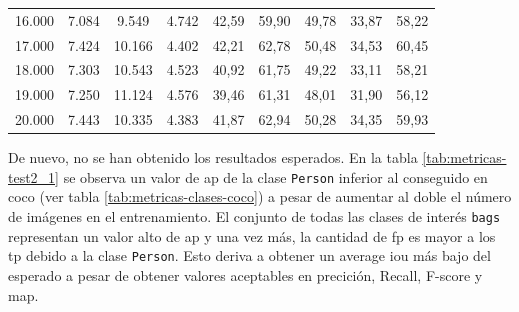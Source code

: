 \begin{table}[ht!]
\begin{tabular}{lcccccccc}
16.000              & 7.084          & 9.549          & 4.742          & 42,59                                                             & 59,90                                                          & 49,78                                                           & 33,87                                                               & 58,22                                                             \\
17.000              & 7.424          & 10.166         & 4.402          & 42,21                                                             & 62,78                                                          & 50,48                                                           & 34,53                                                               & 60,45                                                             \\
18.000              & 7.303          & 10.543         & 4.523          & 40,92                                                             & 61,75                                                          & 49,22                                                           & 33,11                                                               & 58,21                                                             \\
19.000              & 7.250          & 11.124         & 4.576          & 39,46                                                             & 61,31                                                          & 48,01                                                           & 31,90                                                               & 56,12                                                             \\
20.000              & 7.443          & 10.335         & 4.383          & 41,87                                                             & 62,94                                                          & 50,28                                                           & 34,35                                                               & 59,93                                                             \\ \hline
\end{tabular}
\end{table}

De nuevo, no se han obtenido los resultados esperados. En la tabla \ref{tab:metricas-test2_1} se observa un valor de \gls{ap} de la clase \texttt{Person} inferior al conseguido en \gls{coco} (ver tabla \ref{tab:metricas-clases-coco}) a pesar de aumentar al doble el número de imágenes en el entrenamiento. El conjunto de todas las clases de interés \texttt{bags} representan un valor alto de \gls{ap} y una vez más, la cantidad de \gls{fp} es mayor a los \gls{tp} debido a la clase \texttt{Person}. Esto deriva a obtener un average \gls{iou} más bajo del esperado a pesar de obtener valores aceptables en precición, Recall, F-score y \gls{map}.

